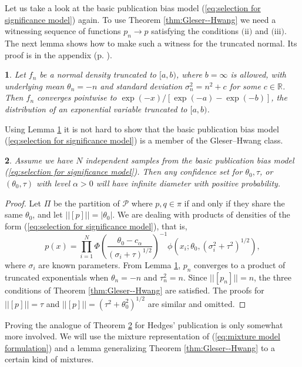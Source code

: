 \documentclass[article]{ajs}
\numberwithin{equation}{section}
\numberwithin{figure}{section}
\theoremstyle{plain}
\newtheorem{thm}{\protect\theoremname}
\theoremstyle{definition}
\theoremstyle{definition}
\theoremstyle{plain}
\newtheorem{lem}[thm]{\protect\lemmaname}
\providecommand{\lemmaname}{Lemma}
\providecommand{\theoremname}{Theorem}
\renewcommand{\sqrt}[1]{{(#1)^{1/2}}}
\begin{document}
Let us take a look at the basic publication bias model (\ref{eq:selection for significance model})
again. To use Theorem \ref{thm:Gleser--Hwang} we need a witnessing
sequence of functions $p_{n}\to p$ satisfying the conditions $\text{(ii)}$
and $\text{(iii)}$. The next lemma shows how to make such a witness
for the truncated normal. Its proof is in the appendix (p. \pageref{proof:generalized shifted exponential}).
\begin{lem}
\label{lem:generalized shifted exponential} Let $f_{n}$ be a normal
density truncated to $[a,b)$, where $b=\infty$ is allowed, with
underlying mean $\theta_{n}=-n$ and standard deviation $\sigma_{n}^{2}=n^{2}+c$
for some $c\in\mathbb{R}$. Then $f_{n}$ converges pointwise to $\exp(-x)/[\exp(-a)-\exp(-b)]$,
the distribution of an exponential variable truncated to $[a,b)$.
\end{lem}

Using Lemma \ref{lem:generalized shifted exponential} it is not hard
to show that the basic publication bias model (\ref{eq:selection for significance model})
is a member of the Gleser--Hwang class.
\begin{thm}
\label{thm:simple publication bias} Assume we have $N$ independent samples
from the basic publication bias model (\ref{eq:selection for significance model}). Then any confidence set for $\theta_{0},\tau$, or
$(\theta_{0},\tau)$ with level $\alpha>0$ will have infinite diameter
with positive probability. 
\end{thm}

\begin{proof}
\label{proof:simple publication bias}Let $\Pi$ be the partition
of $\mathcal{P}$ where $p,q\in\pi$ if and only if they share the
same $\theta_{0}$, and let $||[p]||=|\theta_{0}|$. We are dealing
with products of densities of the form (\ref{eq:selection for significance model}),
that is,
\[
p(x)=\prod_{i=1}^{N}\Phi\left(\frac{\theta_{0}-c_{\alpha}}{\sqrt{\sigma_{i}+\tau}}\right)^{-1}\phi(x_{i};\theta_{0},\sqrt{\sigma_{i}^{2}+\tau^{2}}),
\]
where $\sigma_{i}$ are known parameters. From Lemma \ref{lem:generalized shifted exponential},
$p_{n}$ converges to a product of truncated exponentials when $\theta_{n}=-n$
and $\tau_{n}^{2}=n$. Since $||[p_{n}]||=n$, the three conditions
of Theorem \ref{thm:Gleser--Hwang} are satisfied. The proofs for
$||[p]||=\tau$ and $||[p]||=\sqrt{\tau^{2}+\theta_{0}^{2}}$ are
similar and omitted.
\end{proof}
Proving the analogue of Theorem \ref{thm:simple publication bias}
for Hedges' publication is only somewhat more involved. We will use
the mixture representation of (\ref{eq:mixture model formulation})
and a lemma generalizing Theorem \ref{thm:Gleser--Hwang} to a certain
kind of mixtures. 
\end{document}

